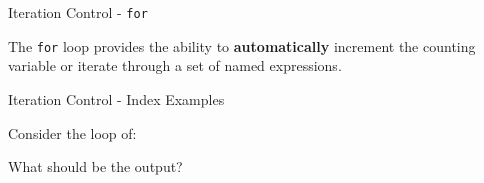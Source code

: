 \begin{frame}[fragile]{Iteration Control - \texttt{for}}

The \texttt{for} loop provides the ability to \textbf{automatically}
increment the counting variable or iterate through a set of named
expressions.

\begin{Shaded}
\begin{Highlighting}[]
\StringTok{ }\NormalTok{(}\NormalTok{,}\NormalTok{, }
      \NormalTok{, }\NormalTok{)}

  \NormalTok{)}
\NormalTok{\}}

\NormalTok{:}\NormalTok{) \{}
  \NormalTok{)}
\NormalTok{\}}
\end{Highlighting}
\end{Shaded}

\end{frame}

\begin{frame}[fragile]{Iteration Control - Index Examples}

Consider the loop of:

\begin{Shaded}
\begin{Highlighting}[]
\StringTok{ }\NormalTok{(}\NormalTok{)}
\NormalTok{:}
  \NormalTok{(}\NormalTok{)}
\NormalTok{\}}
\end{Highlighting}
\end{Shaded}

What should be the output?

\end{frame}


